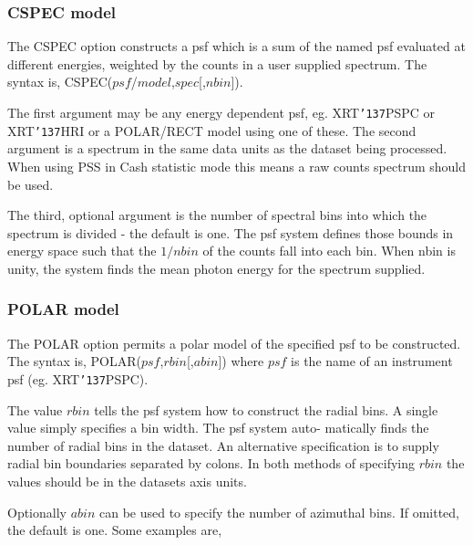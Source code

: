 \documentclass{book}
\renewcommand{\_}{{\tt\char'137}}     %
\begin{document}
\subsubsection{CSPEC model}
The CSPEC option constructs a psf which is a sum of the named
psf evaluated at different energies, weighted by the counts in
a user supplied spectrum. The syntax is, CSPEC($psf$/$model$,$spec$[,$nbin$]).

The first argument may be any energy dependent psf, eg. XRT\_PSPC
or XRT\_HRI or a POLAR/RECT model using one of these. The second
argument is a spectrum in the same data units as the dataset
being processed. When using PSS in Cash statistic mode this means
a raw counts spectrum should be used.

The third, optional argument is the number of spectral bins into
which the spectrum is divided - the default is one. The psf system
defines those bounds in energy space such that the $1/nbin$ of the
counts fall into each bin. When nbin is unity, the system finds
the mean photon energy for the spectrum supplied.

\subsubsection{POLAR model}
The POLAR option permits a polar model of the specified psf
to be constructed. The syntax is, POLAR($psf$,$rbin$[,$abin$])
where $psf$ is the name of an instrument psf (eg. XRT\_PSPC).

The value $rbin$ tells the psf system how to construct the radial bins. A
single value simply specifies a bin width. The psf system auto-
matically finds the number of radial bins in the dataset. An
alternative specification is to supply radial bin boundaries
separated by colons. In both methods of specifying $rbin$ the
values should be in the datasets axis units.

Optionally $abin$ can be used to specify the number of azimuthal
bins. If omitted, the default is one. Some examples are,
\end{document}
